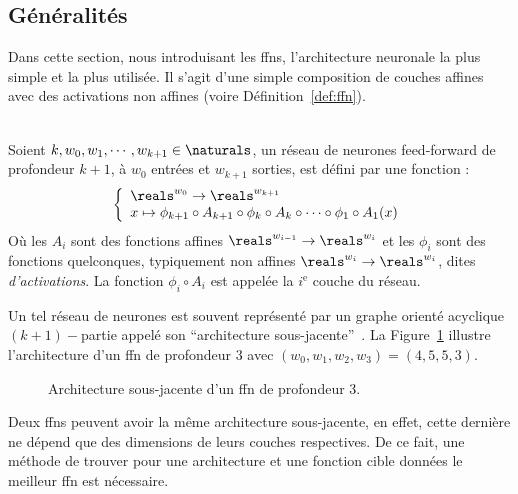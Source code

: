\subsection{Généralités}

Dans cette section, nous introduisant les \Glspl{ffn},
l'architecture neuronale la plus simple et la plus utilisée.
Il s'agit d'une simple composition de couches affines avec des activations non affines 
(voire Définition~\ref{def:ffn}).


\begin{definition}\ \\
    \label{def:ffn}
    Soient \(k, w_0, w_1, \cdots, w_{k+1}\in\naturals\), 
    un réseau de neurones feed-forward de profondeur \(k+1\), à \(w_0\) entrées et \(w_{k+1}\) sorties, 
    est défini par une fonction :
    \begin{equation}
        \label{eq:ffn}
        \left\{
        \begin{array}{l}
            \reals^{w_0} \to \reals^{w_{k+1}}\\
            x\mapsto
            \phi_{k+1} \circ A_{k+1} \circ \phi_k \circ A_k \circ \cdots \circ \phi_1 \circ A_1(x)
        \end{array}
        \right.
    \end{equation}
    Où les \(A_i\) sont des fonctions affines \(\reals^{w_{i-1}}\to\reals^{w_i}\) 
    et les \(\phi_i\) sont des fonctions quelconques, typiquement non affines
    \(\reals^{w_i}\to\reals^{w_i}\), dites \emph{d'activations}.
    La fonction \(\phi_i\circ A_i\) est appelée la \(i^{\mathrm{e}}\) couche du réseau.
\end{definition}

Un tel réseau de neurones est souvent représenté par 
un graphe orienté acyclique \((k+1)-\)partie  appelé son ``architecture sous-jacente''~\parencite{Kearns_Vazirani_1994}. 
La Figure~\ref{fig:ffn} illustre l'architecture d'un \gls{ffn} de profondeur 3
avec \((w_0, w_1, w_2, w_3) = (4, 5, 5, 3)\).


\begin{figure}[hbt]
    \begin{center}
        
    \end{center}
    \caption{Architecture sous-jacente d'un \gls{ffn} de profondeur 3.}
    \label{fig:ffn}
\end{figure}

Deux \glspl{ffn} peuvent avoir la même architecture sous-jacente,
en effet, cette dernière ne dépend que des dimensions de leurs couches respectives.
De ce fait, une méthode de trouver pour une architecture et une fonction cible données 
le meilleur \gls{ffn} est nécessaire.

